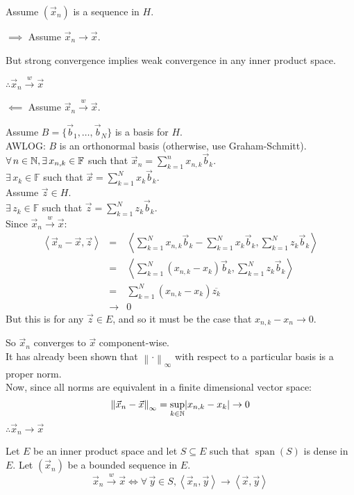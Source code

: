 \documentclass[letterpaper,12pt,fleqn]{article}
\newcommand{\vb}{\vec{b}}
\newcommand{\vx}{\vec{x}}
\newcommand{\vy}{\vec{y}}
\newcommand{\vz}{\vec{z}}
\newcommand{\norm}[1]{\left\|#1\right\|}
\newcommand{\inner}[1]{\left<#1\right>}
\newcommand{\weak}{\overset{w}{\longrightarrow}}
\newcommand{\F}{\mathbb{F}}
\newcommand{\conj}[1]{\overline{#1}}
\DeclareMathOperator{\spn}{span}
\begin{document}
\begin{theproof}
  Assume $(\vx_n)$ is a sequence in $H$.
  \begin{description}
  \item $\implies$ Assume $\vx_n\to\vx$.

    But strong convergence implies weak convergence in any inner product space.

    $\therefore\vx_n\weak\vx$

  \item $\impliedby$ Assume $\vx_n\weak\vx$.

    Assume $B=\{\vb_1,\ldots,\vb_N\}$ is a basis for $H$. \\
    AWLOG: $B$ is an orthonormal basis (otherwise, use Graham-Schmitt). \\
    $\forall\,n\in\N,\exists\,x_{n,k}\in\F$ such that
    $\vx_n=\sum_{k=1}^nx_{n,k}\vb_k$. \\
    $\exists\,x_k\in\F$ such that $\vx=\sum_{k=1}^Nx_k\vb_k$. \\
    Assume $\vz\in H$. \\
    $\exists\,z_k\in\F$ such that $\vz=\sum_{k=1}^Nz_k\vb_k$. \\
    Since $\vx_n\weak\vx$:
    \begin{eqnarray*}
      \inner{\vx_n-\vx,\vz} &=&
      \inner{\sum_{k=1}^Nx_{n,k}\vb_k-\sum_{k=1}^Nx_k\vb_k,\sum_{k=1}^Nz_k\vb_k} \\
      &=& \inner{\sum_{k=1}^N(x_{n,k}-x_k)\vb_k,\sum_{k=1}^Nz_k\vb_k} \\
      &=& \sum_{k=1}^N(x_{n,k}-x_k)\conj{z_k} \\
      &\to& 0
    \end{eqnarray*}
    But this is for any $\vz\in E$, and so it must be the case that
    $x_{n,k}-x_n\to0$.

    So $\vx_n$ converges to $\vx$ component-wise. \\
    It has already been shown that $\norm{\cdot}_{\infty}$ with respect to a
    particular basis is a proper norm. \\
    Now, since all norms are equivalent in a finite dimensional vector space:
    \[\norm{\vx_n-\vx}_{\infty}=\sup_{k\in\N}\abs{x_{n,k}-x_k}\to0\]
    $\therefore\vx_n\to\vx$
  \end{description}
\end{theproof}

\begin{theorem}
  Let $E$ be an inner product space and let $S\subseteq E$ such that
  $\spn(S)$ is dense in $E$. Let $(\vx_n)$ be a bounded sequence in $E$.
  \[\vx_n\weak\vx\iff\forall\,\vy\in S,\inner{\vx_n,\vy}\to\inner{\vx,\vy}\]
\end{theorem}
\end{document}
